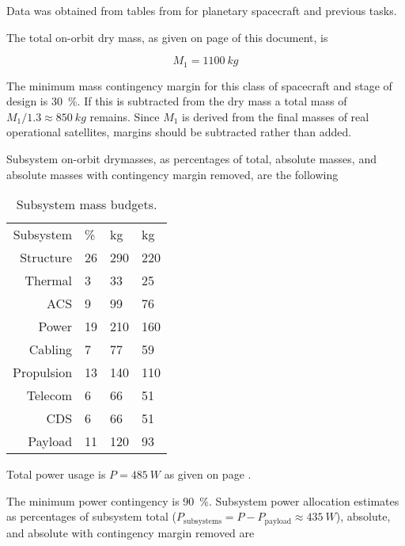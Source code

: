 Data was obtained from tables from
\cite[p. 589,590]{brown2002elements} for planetary spacecraft and
previous tasks.

The total on-orbit dry mass, as given on page \pageref{sec:drymass} of
this document, is

\[ M_1 = \SI{1100}{kg} \]

The minimum mass contingency margin for this class of spacecraft and
stage of design is \SI{30}{\%}. If this is subtracted from the dry
mass a total mass of $M_1 / 1.3 \approx \SI{850}{kg}$ remains. Since
$M_1$ is derived from the final masses of real operational satellites,
margins should be subtracted rather than added.

Subsystem on-orbit drymasses, as percentages of total, absolute
masses, and absolute masses with contingency margin removed, are the
following

\begin{table}[H]
  \label{tbl:massbudget}
  \caption{Subsystem mass budgets.}
  \begin{center}
    \begin{tabular}{rlll}
      Subsystem & \si{\%} & \si{kg} & \si{kg} \\
      Structure & 26 & 290 & 220 \\
      Thermal & 3 & 33 & 25 \\
      ACS & 9 & 99 & 76 \\
      Power & 19 & 210 & 160 \\
      Cabling & 7 & 77 & 59 \\
      Propulsion & 13 & 140 & 110 \\
      Telecom & 6 & 66 & 51 \\
      CDS & 6 & 66 & 51 \\
      Payload & 11 & 120 & 93
    \end{tabular}
  \end{center}
\end{table}

Total power usage is $P = \SI{485}{W}$ as given on page \pageref{sec:power}.

The minimum power contingency is \SI{90}{\%}. Subsystem power
allocation estimates as percentages of subsystem total
($P_\mathrm{subsystems} = P - P_\mathrm{payload} \approx
\SI{435}{W}$), absolute, and absolute with contingency margin removed
are


